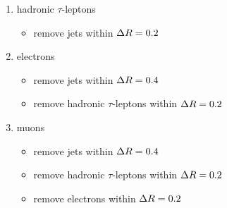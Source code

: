 \begin{enumerate}
    \item hadronic $\tau$-leptons
        \begin{itemize}
            \item remove jets within $\Delta R = 0.2$
        \end{itemize}
    \item electrons
        \begin{itemize}
            \item remove jets within $\Delta R = 0.4$
            \item remove hadronic $\tau$-leptons within $\Delta R = 0.2$
        \end{itemize}
    \item muons
        \begin{itemize}
            \item remove jets within $\Delta R = 0.4$
            \item remove hadronic $\tau$-leptons within $\Delta R = 0.2$
            \item remove electrons within $\Delta R = 0.2$
        \end{itemize}
\end{enumerate}
